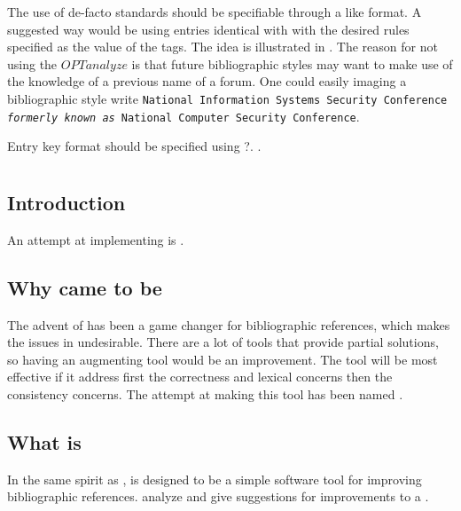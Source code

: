 
The use of de-facto standards should be specifiable through a
{\bibtex} like format.  A suggested way would be using entries
identical with {\bibtex} with the desired rules specified as the value
of the tags.  The idea is illustrated in
.  The reason for not using the
$OPTanalyze$ is that future bibliographic styles may want to make use
of the knowledge of a previous name of a forum.  One could easily
imaging a bibliographic style write \texttt{National Information
  Systems Security Conference \textit{formerly known as} National
  Computer Security Conference}.

Entry key format should be specified using ?. .


\section{{\orangutan}}

\subsection{Introduction}

An attempt at implementing is {\orangutan}.


\subsection{Why {\orangutan} came to be}

The advent of {\bibtex} has been a game changer for bibliographic
references, which makes the issues in {\bibtex} undesirable.  There
are a lot of tools that provide partial solutions, so having an
augmenting tool would be an improvement.  The tool will be most
effective if it address first the correctness and lexical concerns
then the consistency concerns.  The attempt at making this tool has
been named \newdef{\orangutan}.


\subsection{What is {\orangutan}}

In the same spirit as {\bibtex}, {\orangutan} is designed to be a
simple software tool for improving bibliographic references.
{\orangutan} analyze and give suggestions for improvements to a
.


